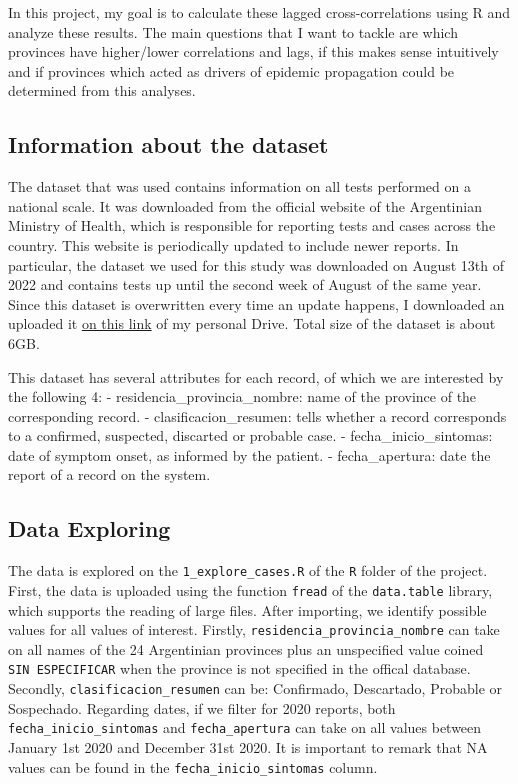 \documentclass[
]{article}
\begin{document}
In this project, my goal is to calculate these lagged cross-correlations
using R and analyze these results. The main questions that I want to
tackle are which provinces have higher/lower correlations and lags, if
this makes sense intuitively and if provinces which acted as drivers of
epidemic propagation could be determined from this analyses.

\hypertarget{information-about-the-dataset}{%
\subsection{Information about the
dataset}\label{information-about-the-dataset}}

The dataset that was used contains information on all tests performed on
a national scale. It was downloaded from the official website of the
Argentinian Ministry of Health, which is responsible for reporting tests
and cases across the country. This website is periodically updated to
include newer reports. In particular, the dataset we used for this study
was downloaded on August 13th of 2022 and contains tests up until the
second week of August of the same year. Since this dataset is
overwritten every time an update happens, I downloaded an uploaded it
\href{https://drive.google.com/file/d/1j1QXQZu60LGApLWroKqafhmUa9XdE-m7/view?usp=sharing}{on
this link} of my personal Drive. Total size of the dataset is about 6GB.

This dataset has several attributes for each record, of which we are
interested by the following 4: - residencia\_provincia\_nombre: name of
the province of the corresponding record. - clasificacion\_resumen:
tells whether a record corresponds to a confirmed, suspected, discarted
or probable case. - fecha\_inicio\_sintomas: date of symptom onset, as
informed by the patient. - fecha\_apertura: date the report of a record
on the system.

\hypertarget{data-exploring}{%
\subsection{Data Exploring}\label{data-exploring}}

The data is explored on the \texttt{1\_explore\_cases.R} of the
\texttt{R} folder of the project. First, the data is uploaded using the
function \texttt{fread} of the \texttt{data.table} library, which
supports the reading of large files. After importing, we identify
possible values for all values of interest. Firstly,
\texttt{residencia\_provincia\_nombre} can take on all names of the 24
Argentinian provinces plus an unspecified value coined
\texttt{SIN\ ESPECIFICAR} when the province is not specified in the
offical database. Secondly, \texttt{clasificacion\_resumen} can be:
Confirmado, Descartado, Probable or Sospechado. Regarding dates, if we
filter for 2020 reports, both \texttt{fecha\_inicio\_sintomas} and
\texttt{fecha\_apertura} can take on all values between January 1st 2020
and December 31st 2020. It is important to remark that NA values can be
found in the \texttt{fecha\_inicio\_sintomas} column.
\end{document}
